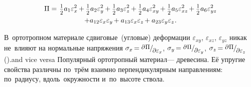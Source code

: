 {\nopagebreak\vspace{-0.25em}\begin{multline*}
\potential =^{\mathstrut^{\mathstrut}} \smalldisplaystyleonehalf a_1 \varepsilon^2_{x} \hspace{-0.1ex} + \smalldisplaystyleonehalf a_2 \varepsilon^2_{y} \hspace{-0.1ex} + \smalldisplaystyleonehalf a_3 \varepsilon^2_{z} \hspace{-0.1ex} + \smalldisplaystyleonehalf a_4 \varepsilon^2_{xy} \hspace{-0.2ex} + \smalldisplaystyleonehalf a_5 \varepsilon^2_{xz} \hspace{-0.2ex} + \smalldisplaystyleonehalf a_6 \varepsilon^2_{yz}
\\[-0.1em]
%
+ a_{12} \varepsilon_{x} \varepsilon_{y} \hspace{-0.2ex} + a_{13} \varepsilon_{x} \varepsilon_{z} \hspace{-0.2ex} + a_{23} \varepsilon_{y} \varepsilon_{z}
\hspace{.1ex}
.
\end{multline*}

В~ортотропном материале
сдвиговые~(угловые) деформации
$\varepsilon_{xy}$, $\varepsilon_{xz}$, $\varepsilon_{yz}$
никак не~влияют
на нормальные напряжения
${
   \sigma_x \hspace{-0.25ex}
   = \raisemath{.16em} {
      \scalebox{.88}{$ \partial \hspace{.1ex} \potential $}
   }
   \hspace{-0.1ex} / \hspace{-0.2ex}
   \raisemath{-0.32em} {
      \scalebox{.88}{$ \partial \varepsilon_x $}
   }
}$,
${
   \sigma_y \hspace{-0.25ex}
   = \raisemath{.16em} {
      \scalebox{.88}{$ \partial \hspace{.1ex} \potential $}
}
\hspace{-0.1ex} / \hspace{-0.2ex}
\raisemath{-0.32em} {
   \scalebox{.88}{$ \partial \varepsilon_y $}
}
}$,
${\sigma_z \hspace{-0.25ex}
   =
   \raisemath{.16em} {
      \scalebox{.88}{$ \partial \hspace{.1ex} \potential $}
   }
   \hspace{-0.1ex} / \hspace{-0.2ex} \raisemath{-0.32em} {
      \scalebox{.88}{$ \partial \varepsilon_z $}
  }
}$ ().and vice versa
Популярный
ортотропный материал\:---
древесина.
Её упругие свойства
различны
по~трём
взаимно перпендикулярным
направлениям:
по~радиусу,
вдоль~окружности
и~по~высоте ствола.

}
